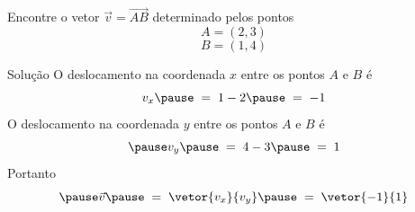 \begin{question}
  Encontre o vetor $\vec{v} = \overrightarrow{AB}$ determinado pelos pontos
  \[
    A = ( 2, 3 )
  \]
  \[
    B = ( 1, 4 )
  \]
\end{question}

\begin{resolution}{Solução}
  O deslocamento na coordenada $x$ entre os pontos $A$ e $B$ é
  \pause
  \[
    v_x
    \pause
    \;=\; 1 - 2
    \pause
    \;=\; -1
  \]
  \pause
  O deslocamento na coordenada $y$ entre os pontos $A$ e $B$ é
  \[
    \pause
    v_y
    \pause
    \;=\; 4 - 3
    \pause
    \;=\; 1
  \]
  \pause
  Portanto
  \[
    \pause
    \vec{v}
    \pause
    \;=\; \vetor{v_x}{v_y}
    \pause
    \;=\; \vetor{-1}{1}
  \]
\end{resolution}

\endinput
